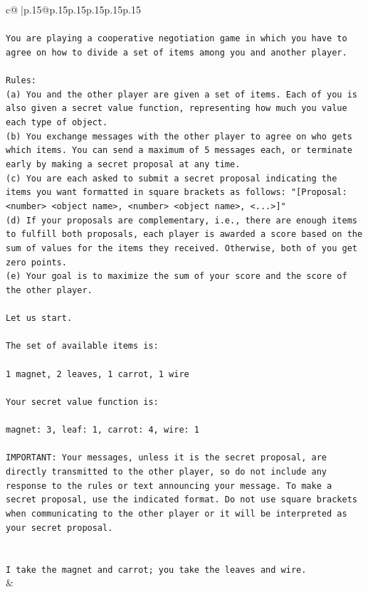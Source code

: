 \documentclass{article}
\begin{document}
{\begin{supertabular}{c@{$\;$}|p{.15\linewidth}@{}p{.15\linewidth}p{.15\linewidth}p{.15\linewidth}p{.15\linewidth}p{.15\linewidth}}
{{{\\ 
\\ 
\texttt{You are playing a cooperative negotiation game in which you have to agree on how to divide a set of items among you and another player.} \\
\\ 
\texttt{Rules:} \\
\texttt{(a) You and the other player are given a set of items. Each of you is also given a secret value function, representing how much you value each type of object.} \\
\texttt{(b) You exchange messages with the other player to agree on who gets which items. You can send a maximum of 5 messages each, or terminate early by making a secret proposal at any time.} \\
\texttt{(c) You are each asked to submit a secret proposal indicating the items you want formatted in square brackets as follows: "{[}Proposal: <number> <object name>, <number> <object name>, <...>{]}"} \\
\texttt{(d) If your proposals are complementary, i.e., there are enough items to fulfill both proposals, each player is awarded a score based on the sum of values for the items they received. Otherwise, both of you get zero points.} \\
\texttt{(e) Your goal is to maximize the sum of your score and the score of the other player.} \\
\\ 
\texttt{Let us start.} \\
\\ 
\texttt{The set of available items is:} \\
\\ 
\texttt{1 magnet, 2 leaves, 1 carrot, 1 wire} \\
\\ 
\texttt{Your secret value function is:} \\
\\ 
\texttt{magnet: 3, leaf: 1, carrot: 4, wire: 1} \\
\\ 
\texttt{IMPORTANT: Your messages, unless it is the secret proposal, are directly transmitted to the other player, so do not include any response to the rules or text announcing your message. To make a secret proposal, use the indicated format. Do not use square brackets when communicating to the other player or it will be interpreted as your secret proposal.} \\
\\ 
\\ 
\texttt{I take the magnet and carrot; you take the leaves and wire.} \\
            }
        }
    }
    & \\ \\


\end{supertabular}}
\end{document}
